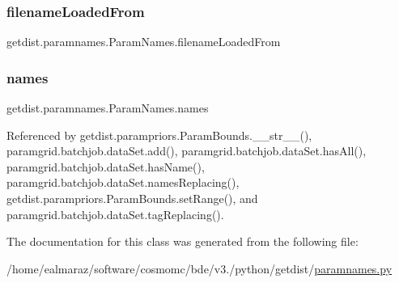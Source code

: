 \subsubsection{\texorpdfstring{filename\+Loaded\+From}{filenameLoadedFrom}}
{\footnotesize\ttfamily getdist.\+paramnames.\+Param\+Names.\+filename\+Loaded\+From}

\mbox{\label{classgetdist_1_1paramnames_1_1ParamNames_aed2206642272e0ebb34478932a71b6c5}} 
\subsubsection{\texorpdfstring{names}{names}}
{\footnotesize\ttfamily getdist.\+paramnames.\+Param\+Names.\+names}



Referenced by getdist.\+parampriors.\+Param\+Bounds.\+\_\+\+\_\+str\+\_\+\+\_\+(), paramgrid.\+batchjob.\+data\+Set.\+add(), paramgrid.\+batchjob.\+data\+Set.\+has\+All(), paramgrid.\+batchjob.\+data\+Set.\+has\+Name(), paramgrid.\+batchjob.\+data\+Set.\+names\+Replacing(), getdist.\+parampriors.\+Param\+Bounds.\+set\+Range(), and paramgrid.\+batchjob.\+data\+Set.\+tag\+Replacing().



The documentation for this class was generated from the following file\+:\begin{DoxyCompactItemize}
\item 
/home/ealmaraz/software/cosmomc/bde/v3./python/getdist/\mbox{\hyperlink{paramnames_8py}{paramnames.\+py}}\end{DoxyCompactItemize}
